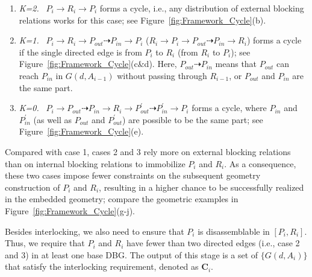 \begin{enumerate}[label=(\arabic*), leftmargin=*]
	\vspace*{-0.5mm}
	\item
	{\em K=2.}  \
	$P_i \rightarrow  R_i \rightarrow  P_i$ forms a cycle, i.e., any distribution of external blocking relations works for this case; see Figure~\ref{fig:Framework_Cycle}(b).

	\vspace*{0.5mm}
	\item
	{\em K=1.} \
	$P_i \rightarrow  R_i \rightarrow  P_{out} \dashrightarrow P_{in} \rightarrow P_i$ ($R_i \rightarrow  P_i \rightarrow  P_{out} \dashrightarrow P_{in} \rightarrow R_i$) forms a cycle if the single directed edge is from $P_i$ to $R_i$ (from $R_i$ to $P_i$); see Figure~\ref{fig:Framework_Cycle}(c\&d).
    Here, $P_{out} \dashrightarrow P_{in}$ means that $P_{out}$ can reach $P_{in}$ in $G(d, A_{i-1})$ without passing through $R_{i-1}$, or $P_{out}$ and $P_{in}$ are the same part.

	\vspace*{0.5mm}
	\item
	{\em K=0.} \
	$P_i \rightarrow  P_{out} \dashrightarrow  P_{in} \rightarrow R_i \rightarrow  P_{out}^{'} \dashrightarrow P_{in}^{'} \rightarrow P_i$ forms a cycle, where $P_{in}$ and $P_{in}^{'}$ (as well as $P_{out}$ and $P_{out}^{'}$) are possible to be the same part; see Figure~\ref{fig:Framework_Cycle}(e).
	
\end{enumerate}	

Compared with case 1, cases 2 and 3 rely more on external blocking relations than on internal blocking relations to immobilize $P_i$ and $R_i$.
As a consequence, these two cases impose fewer constraints on the subsequent geometry construction of $P_i$ and $R_i$,  resulting in a higher chance to be successfully realized in the embedded geometry; compare the geometric examples in Figure~\ref{fig:Framework_Cycle}(g-j).

Besides interlocking, we also need to ensure that $P_i$ is disassemblable in $[P_i, R_i]$.
Thus, we require that $P_i$ and $R_i$ have fewer than two directed edges (i.e., case 2 and 3) in at least one base DBG.
The output of this stage is a set of $\{G(d, A_i)\}$ that satisfy the interlocking requirement, denoted as $\mathbf{C}_i$.

